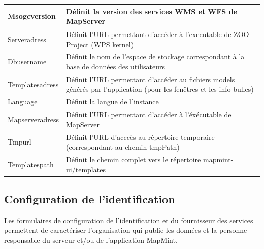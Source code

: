 \documentclass[letterpaper,10pt,french]{sphinxmanual}
\begin{document}
\begin{tabulary}{\linewidth}{|L|L|}
\\
\hline
Msogcversion
 & 
Définit la version des services WMS et WFS de MapServer
\\
\hline
Serveradress
 & 
Définit l'URL permettant d'accéder à l'executable de ZOO-Project (WPS kernel)
\\
\hline
Dbusername
 & 
Définit le nom de l'espace de stockage correspondant à la base de données des utilisateurs
\\
\hline
Templatesadress
 & 
Définit l'URL permettant d'accéder au fichiers models générés par l'application (pour les fenêtres et les info bulles)
\\
\hline
Language
 & 
Définit la langue de l'instance
\\
\hline
Mapserveradress
 & 
Définit l'URL permettant d'accéder à l'éxécutable de MapServer
\\
\hline
Tmpurl
 & 
Définit l'URL d'acccès au répertoire temporaire (correspondant au chemin tmpPath)
\\
\hline
Templatespath
 & 
Définit le chemin complet vers le répertoire mapmint-ui/templates
\\
\hline\end{tabulary}



\subsection{Configuration de l'identification}
\label{dashboard/configuration:configuration-de-l-identification}
Les formulaires de configuration de l'identification et du fournisseur des services permettent de caractériser l'organisation qui publie les données et la personne responsable du serveur et/ou de l'application MapMint.
\end{document}
